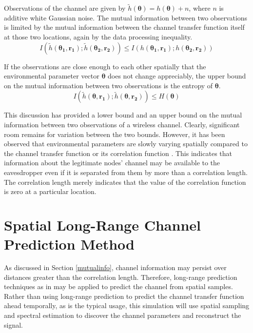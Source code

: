 \documentclass{allertonproc}
\begin{document}
Observations of the channel are given by $\tilde{h}(\boldsymbol{\theta})=h(\boldsymbol{\theta})+n$, where $n$ is additive white Gaussian noise.  The mutual information between two observations is limited by the mutual information between the channel transfer function itself at those two locations, again by the data processing inequality.
\begin{equation}
I(\tilde{h}(\boldsymbol{\theta_1},\mathbf{r_1}); \tilde{h}(\boldsymbol{\theta_2},\mathbf{r_2}))\leq I(h(\boldsymbol{\theta_1},\mathbf{r_1}); h(\boldsymbol{\theta_2},\mathbf{r_2}))
\end{equation}

If the observations are close enough to each other spatially that the environmental parameter vector $\boldsymbol{\theta}$ does not change appreciably, the upper bound on the mutual information between two observations is the entropy of $\boldsymbol{\theta}$.
\begin{equation}
I(\tilde{h}(\boldsymbol{\theta},\mathbf{r_1}); \tilde{h}(\boldsymbol{\theta},\mathbf{r_2}))\leq H(\boldsymbol{\theta})
\end{equation}

This discussion has provided a lower bound and an upper bound on the mutual information between two observations of a wireless channel.  Clearly, significant room remains for variation between the two bounds.  However, it has been observed that environmental parameters are slowly varying spatially compared to the channel transfer function or its correlation function \cite{jakes1974, duel-hallen2007}.  This indicates that information about the legitimate nodes' channel may be available to the eavesdropper even if it is separated from them by more than a correlation length.   The correlation length merely indicates that the value of the correlation function is zero at a particular location.  

\section{Spatial Long-Range Channel Prediction Method}\label{prediction}
As discussed in Section \ref{mutualinfo}, channel information may persist over distances greater than the correlation length. Therefore, long-range prediction techniques as in \cite{duel-hallen2007} may be applied to predict the channel from spatial samples. Rather than using long-range prediction to predict the channel transfer function ahead temporally, as is the typical usage, this simulation will use spatial sampling and spectral estimation to discover the channel parameters and reconstruct the signal.
\end{document}
